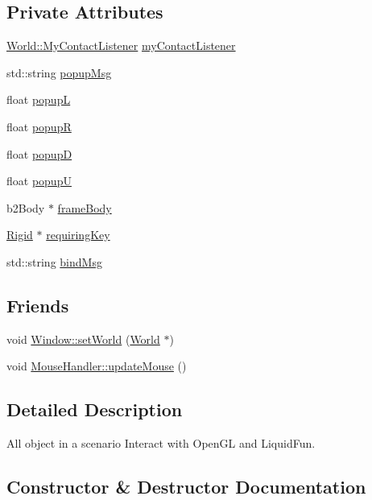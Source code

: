 \subsection*{Private Attributes}
\begin{DoxyCompactItemize}
\item 
\hyperlink{classWorld_1_1MyContactListener}{World\+::\+My\+Contact\+Listener} \hyperlink{classWorld_a558284d05f4c41360eacba52df48c389}{my\+Contact\+Listener}
\item 
std\+::string \hyperlink{classWorld_a9fafe9a7426c487a992615e518e90b23}{popup\+Msg}
\item 
float \hyperlink{classWorld_a66ec162a547f0b34a40b98f867833f64}{popup\+L}
\item 
float \hyperlink{classWorld_a9494741a4ec9fa6f5464d65e7bba936d}{popup\+R}
\item 
float \hyperlink{classWorld_ac01138a7966b75a74c468f3a45aa58ee}{popup\+D}
\item 
float \hyperlink{classWorld_a0ead2d71b58e78a8f321994436b3ed03}{popup\+U}
\item 
b2\+Body $\ast$ \hyperlink{classWorld_a2064bf96839978201b9b332dda472dee}{frame\+Body}
\item 
\hyperlink{classRigid}{Rigid} $\ast$ \hyperlink{classWorld_a412f2eb7706336e953b24031447a5060}{requiring\+Key}
\item 
std\+::string \hyperlink{classWorld_a08c11650552d3e7a723b09afc628dfb3}{bind\+Msg}
\end{DoxyCompactItemize}
\subsection*{Friends}
\begin{DoxyCompactItemize}
\item 
void \hyperlink{classWorld_a114ccd993c0013f7d74f046d597bdf35}{Window\+::set\+World} (\hyperlink{classWorld}{World} $\ast$)
\item 
void \hyperlink{classWorld_a881adea56e40e4fed79d7c7b68f41a91}{Mouse\+Handler\+::update\+Mouse} ()
\end{DoxyCompactItemize}


\subsection{Detailed Description}
All object in a scenario Interact with Open\+G\+L and Liquid\+Fun. 

\subsection{Constructor \& Destructor Documentation}
\hypertarget{classWorld_a18f20395a332752c4a3d98f2b0e98cff}{}
